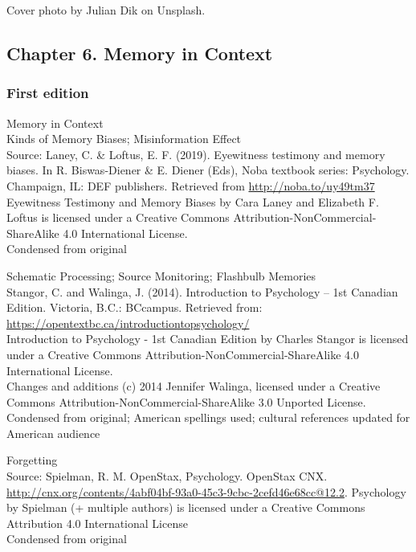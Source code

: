 \documentclass[
]{krantz}
\begin{document}
Cover photo by Julian Dik on Unsplash.

\hypertarget{chapter-6.-memory-in-context}{%
\subsection*{Chapter 6. Memory in Context}\label{chapter-6.-memory-in-context}}


\hypertarget{first-edition-6}{%
\subsubsection*{First edition}\label{first-edition-6}}


Memory in Context\\
Kinds of Memory Biases; Misinformation Effect\\
Source: Laney, C. \& Loftus, E. F. (2019). Eyewitness testimony and memory biases. In R. Biswas-Diener \& E. Diener (Eds), Noba textbook series: Psychology. Champaign, IL: DEF publishers. Retrieved from \url{http://noba.to/uy49tm37}\\
Eyewitness Testimony and Memory Biases by Cara Laney and Elizabeth F. Loftus is licensed under a Creative Commons Attribution-NonCommercial-ShareAlike 4.0 International License.\\
Condensed from original

Schematic Processing; Source Monitoring; Flashbulb Memories\\
Stangor, C. and Walinga, J. (2014). Introduction to Psychology -- 1st Canadian Edition. Victoria, B.C.: BCcampus. Retrieved from: \url{https://opentextbc.ca/introductiontopsychology/}\\
Introduction to Psychology - 1st Canadian Edition by Charles Stangor is licensed under a Creative Commons Attribution-NonCommercial-ShareAlike 4.0 International License.\\
Changes and additions (c) 2014 Jennifer Walinga, licensed under a Creative Commons Attribution-NonCommercial-ShareAlike 3.0 Unported License.\\
Condensed from original; American spellings used; cultural references updated for American audience

Forgetting\\
Source: Spielman, R. M. OpenStax, Psychology. OpenStax CNX. \url{http://cnx.org/contents/4abf04bf-93a0-45c3-9cbc-2cefd46e68cc@12.2}.
Psychology by Spielman (+ multiple authors) is licensed under a Creative Commons Attribution 4.0 International License\\
Condensed from original
\end{document}
